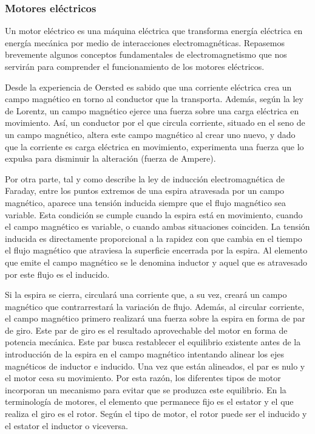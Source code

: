 \subsubsection{Motores eléctricos}

Un motor eléctrico es una máquina eléctrica que transforma energía
eléctrica en energía mecánica por medio de interacciones electromagnéticas.
Repasemos brevemente algunos conceptos fundamentales de electromagnetismo
que nos servirán para comprender el funcionamiento de los motores
eléctricos. 

Desde la experiencia de Oersted es sabido que una corriente eléctrica
crea un campo magnético en torno al conductor que la transporta. Además,
según la ley de Lorentz, un campo magnético ejerce una fuerza sobre
una carga eléctrica en movimiento. Así, un conductor por el que circula
corriente, situado en el seno de un campo magnético, altera este campo
magnético al crear uno nuevo, y dado que la corriente es carga eléctrica
en movimiento, experimenta una fuerza que lo expulsa para disminuir
la alteración (fuerza de Ampere).

Por otra parte, tal y como describe la ley de inducción electromagnética
de Faraday, entre los puntos extremos de una espira atravesada por
un campo magnético, aparece una tensión inducida siempre que el flujo
magnético sea variable. Esta condición se cumple cuando la espira
está en movimiento, cuando el campo magnético es variable, o cuando
ambas situaciones coinciden. La tensión inducida es directamente proporcional
a la rapidez con que cambia en el tiempo el flujo magnético que atraviesa
la superficie encerrada por la espira. Al elemento que emite el campo
magnético se le denomina inductor y aquel que es atravesado por este
flujo es el inducido. 

Si la espira se cierra, circulará una corriente que, a su vez, creará
un campo magnético que contrarrestará la variación de flujo. Además,
al circular corriente, el campo magnético primero realizará una fuerza
sobre la espira en forma de par de giro. Este par de giro es el resultado
aprovechable del motor en forma de potencia mecánica. Este par busca
restablecer el equilibrio existente antes de la introducción de la
espira en el campo magnético intentando alinear los ejes magnéticos
de inductor e inducido. Una vez que están alineados, el par es nulo
y el motor cesa su movimiento. Por esta razón, los diferentes tipos
de motor incorporan un mecanismo para evitar que se produzca este
equilibrio. En la terminología de motores, el elemento que permanece
fijo es el estator y el que realiza el giro es el rotor. Según el
tipo de motor, el rotor puede ser el inducido y el estator el inductor
o viceversa. 

